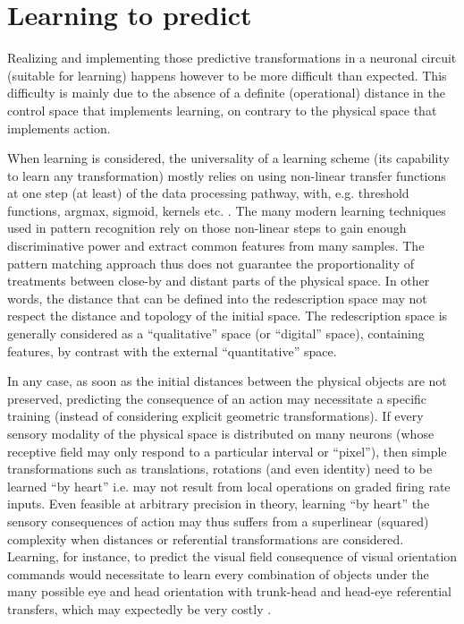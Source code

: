 \documentclass[11pt]{article}
\begin{document}
\section{Learning to predict}

Realizing and implementing those predictive transformations in a neuronal circuit (suitable for learning) happens however to be more difficult than expected. This difficulty is mainly due to the absence of a definite (operational) distance in the control space that implements learning, on contrary to the physical space that implements action.  

When learning is considered, the universality of a learning scheme  (its capability to learn any transformation) mostly relies on using non-linear transfer functions at one step (at least) of the data processing pathway, with, e.g. threshold functions, argmax, sigmoid, kernels etc.  . The many modern learning techniques used in pattern recognition rely on those non-linear steps to gain enough discriminative power and extract common features from many samples. The pattern matching approach thus does not guarantee the proportionality of treatments between close-by and distant parts of the physical space.   In other words, the distance that can be defined into the redescription space may not  respect the distance and topology of the initial space. The redescription space is generally considered as a ``qualitative'' space (or ``digital'' space), containing features,  by contrast with the external ``quantitative'' space. 

In any case, as soon as the initial distances between the physical objects are not preserved, predicting the consequence of an action may necessitate a specific training (instead of considering explicit geometric transformations). If every sensory modality of the physical space is distributed on many neurons (whose receptive field may only respond to a particular interval or ``pixel''), then simple transformations such as translations, rotations (and even identity) need to be learned ``by heart'' \cite{Pouget1997} i.e. may not result from local operations on graded firing rate inputs. 
Even feasible at arbitrary precision in theory, learning ``by heart'' the sensory consequences of action may thus suffers from a superlinear (squared) complexity when distances or referential transformations are considered. Learning, for instance, to predict the visual field consequence of visual orientation commands would necessitate to 
learn every combination of objects under the many possible eye and head orientation with trunk-head and head-eye referential transfers, which may expectedly be very costly .
\end{document}
